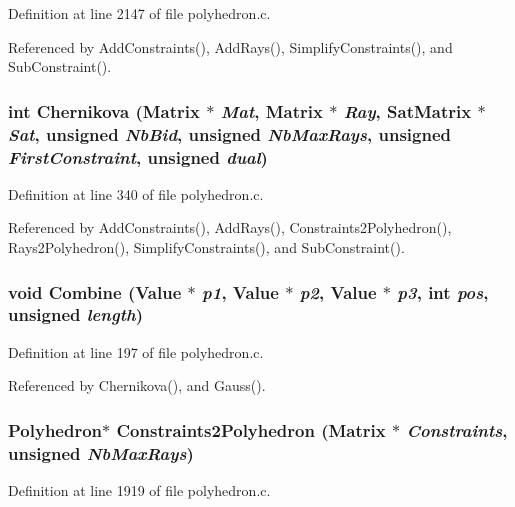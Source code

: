 Definition at line 2147 of file polyhedron.c.

Referenced by Add\-Constraints(), Add\-Rays(), Simplify\-Constraints(), and Sub\-Constraint().

\subsubsection{\setlength{\rightskip}{0pt plus 5cm}int Chernikova (Matrix $\ast$ {\em Mat}, Matrix $\ast$ {\em Ray}, {\bf Sat\-Matrix} $\ast$ {\em Sat}, unsigned {\em Nb\-Bid}, unsigned {\em Nb\-Max\-Rays}, unsigned {\em First\-Constraint}, unsigned {\em dual})\hspace{0.3cm}{\tt  [static]}}\label{polyhedron_8c_a14}




Definition at line 340 of file polyhedron.c.

Referenced by Add\-Constraints(), Add\-Rays(), Constraints2Polyhedron(), Rays2Polyhedron(), Simplify\-Constraints(), and Sub\-Constraint().

\subsubsection{\setlength{\rightskip}{0pt plus 5cm}void Combine (Value $\ast$ {\em p1}, Value $\ast$ {\em p2}, Value $\ast$ {\em p3}, int {\em pos}, unsigned {\em length})\hspace{0.3cm}{\tt  [static]}}\label{polyhedron_8c_a11}




Definition at line 197 of file polyhedron.c.

Referenced by Chernikova(), and Gauss().

\subsubsection{\setlength{\rightskip}{0pt plus 5cm}Polyhedron$\ast$ Constraints2Polyhedron (Matrix $\ast$ {\em Constraints}, unsigned {\em Nb\-Max\-Rays})}\label{polyhedron_8c_a24}




Definition at line 1919 of file polyhedron.c.

